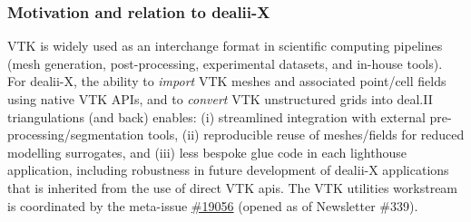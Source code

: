 \documentclass[a4paper,12pt]{article}
\newcommand{\issue}[1]{\href{https://github.com/dealii/dealii/issues/#1}{\##1}}
\newcommand{\pr}[1]{\href{https://github.com/dealii/dealii/pull/#1}{PR:\##1}}
\begin{document}
\subsubsection{Motivation and relation to dealii-X} VTK is widely used
as an interchange format in scientific computing pipelines (mesh
generation, post-processing, experimental datasets, and in-house
tools). For dealii-X, the ability to \emph{import} VTK meshes and
associated point/cell fields using native VTK APIs, and to
\emph{convert} VTK unstructured grids into deal.II triangulations (and
back) enables: (i) streamlined integration with external
pre-processing/segmentation tools, (ii) reproducible reuse of
meshes/fields for reduced modelling surrogates, and (iii) less bespoke
glue code in each lighthouse application, including robustness in
future development of dealii-X applications that is inherited from the
use of direct VTK apis. The VTK utilities workstream is coordinated by
the meta-issue \issue{19056} (opened as of Newsletter \#339).%



\end{document}
